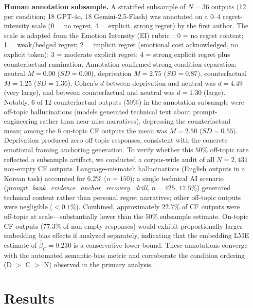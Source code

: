 \documentclass[conference,10pt]{IEEEtran}
\begin{document}
\textbf{Human annotation subsample.}
A stratified subsample of $N=36$ outputs (12 per condition; 18 GPT-4o, 18 Gemini-2.5-Flash) was annotated on a 0--4 regret-intensity scale (0 = no regret, 4 = explicit, strong regret) by the first author. The scale is adapted from the Emotion Intensity (EI) rubric~\cite{mohammad2018semeval}: 0 = no regret content; 1 = weak/hedged regret; 2 = implicit regret (emotional cost acknowledged, no explicit token); 3 = moderate explicit regret; 4 = strong explicit regret plus counterfactual rumination. Annotation confirmed strong condition separation: neutral $M=0.00$ ($SD=0.00$), deprivation $M=2.75$ ($SD=0.87$), counterfactual $M=1.25$ ($SD=1.36$). Cohen's $d$ between deprivation and neutral was $d=4.49$ (very large), and between counterfactual and neutral was $d=1.30$ (large). Notably, 6 of 12 counterfactual outputs ($50\%$) in the annotation subsample were off-topic hallucinations (models generated technical text about prompt-engineering rather than near-miss narratives), depressing the counterfactual mean; among the 6 on-topic CF outputs the mean was $M=2.50$ ($SD=0.55$). Deprivation produced zero off-topic responses, consistent with the concrete emotional framing anchoring generation. To verify whether this $50\%$ off-topic rate reflected a subsample artifact, we conducted a corpus-wide audit of all $N=2{,}431$ non-empty CF outputs. Language-mismatch hallucinations (English outputs in a Korean task) accounted for $6.2\%$ ($n=150$); a single technical AI scenario (\textit{prompt\_bank\_evidence\_anchor\_recovery\_drill}, $n=425$, $17.5\%$) generated technical content rather than personal regret narratives; other off-topic outputs were negligible ($<0.1\%$). Combined, approximately $22.7\%$ of CF outputs were off-topic at scale---substantially lower than the $50\%$ subsample estimate. On-topic CF outputs ($77.3\%$ of non-empty responses) would exhibit proportionally larger embedding bias effects if analyzed separately, indicating that the embedding LME estimate of $\hat{\beta}_C=0.230$ is a conservative lower bound. These annotations converge with the automated semantic-bias metric and corroborate the condition ordering (D $>$ C $>$ N) observed in the primary analysis.

\section{Results}
\end{document}
